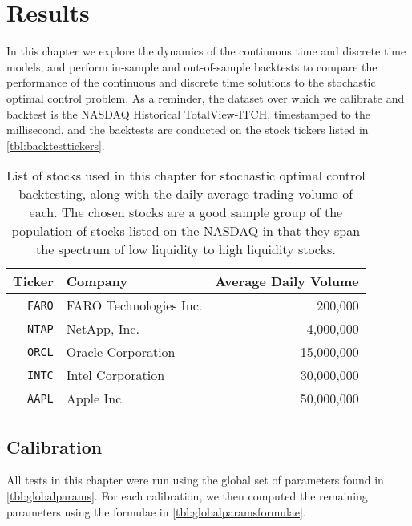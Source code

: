%
%
%
%
\chapter{Results}

In this chapter we explore the dynamics of the continuous time and discrete time models, and perform in-sample and out-of-sample backtests to compare the performance of the continuous and discrete time solutions to the stochastic optimal control problem. As a reminder, the dataset over which we calibrate and backtest is the NASDAQ Historical TotalView-ITCH, timestamped to the millisecond, and the backtests are conducted on the stock tickers listed in \autoref{tbl:backtesttickers}.

\begin{table}[H]%
\centering%
%
\caption[Stocks used in the stochastic optimal control backtesting]{List of stocks used in this chapter for stochastic optimal control backtesting, along with the daily average trading volume of each. The chosen stocks are a good sample group of the population of stocks listed on the NASDAQ in that they span the spectrum of low liquidity to high liquidity stocks.}\label{tbl:backtesttickers}%
\begin{tabular}{@{} rlr @{}}%
\toprule
Ticker & Company & Average Daily Volume \\
\midrule
\texttt{FARO} & FARO Technologies Inc. & 200,000 \\
\texttt{NTAP} & NetApp, Inc. & 4,000,000 \\
\texttt{ORCL} & Oracle Corporation & 15,000,000 \\
\texttt{INTC} & Intel Corporation & 30,000,000 \\
\texttt{AAPL} & Apple Inc. & 50,000,000 \\
\bottomrule
\end{tabular}%
\end{table}%

\section{Calibration}

All tests in this chapter were run using the global set of parameters found in \autoref{tbl:globalparams}. For each calibration, we then computed the remaining parameters using the formulae in \autoref{tbl:globalparamsformulae}.

